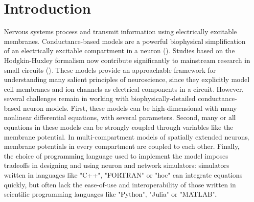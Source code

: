\documentclass{frontiersSCNS} %
\begin{document}
\section{Introduction}
\label{sec:intro}

Nervous systems process and transmit information using electrically excitable membranes. Conductance-based models are a powerful biophysical simplification of an electrically excitable compartment in a neuron (\cite{hodgkinQuantitativeDescriptionMembrane1952}). Studies based on the Hodgkin-Huxley formalism now contribute significantly to mainstream research in small circuits (\cite{marderTheoryMotion1995, prinzComputationalApproachesNeuronal2010, prinzInsightsModelsRhythmic2006}). These models provide an approachable framework for understanding many salient principles of neuroscience, since they explicitly model cell membranes and ion channels as electrical components in a circuit. However, several challenges remain in working with biophysically-detailed conductance-based neuron models. First, these models can be high-dimensional with many nonlinear differential equations, with several parameters. Second, many or all equations in these models can be strongly coupled through variables like the membrane potential.  In multi-compartment models of spatially extended neurons, membrane potentials in every compartment are coupled to each other. Finally, the choice of programming language used to implement the model imposes tradeoffs in designing and using neuron and network simulators: simulators written in languages like "C++", "FORTRAN" or "hoc" can integrate equations quickly, but often lack the ease-of-use and interoperability of those written in scientific programming languages like "Python", "Julia" or "MATLAB". 
\end{document}

